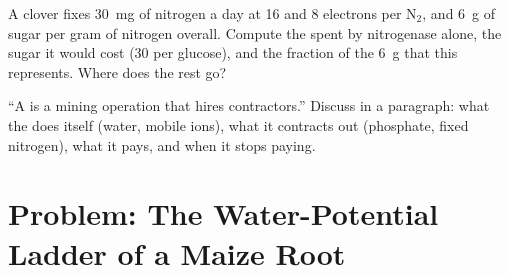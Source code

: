 \begin{exercise}[$\star\star\star$]\label{exo:b1:plant-water-minerals:11}
A clover fixes \qty{30}{mg} of nitrogen a day at \qty{16}{}  and
\qty{8}{} electrons per $\mathrm{N_2}$, and \qty{6}{g} of sugar per gram
of nitrogen overall. Compute the  spent by nitrogenase alone, the
sugar it would cost (30  per glucose), and the fraction of the
\qty{6}{g} that this represents. Where does the rest go?
\end{exercise}

\begin{exercise}[$\star\star\star$]\label{exo:b1:plant-water-minerals:12}
``A  is a mining operation that hires contractors.'' Discuss in a
paragraph: what the  does itself (water, mobile ions), what it
contracts out (phosphate, fixed nitrogen), what it pays, and when it
stops paying.
\end{exercise}

\section{Problem: The Water-Potential Ladder of a Maize Root}


